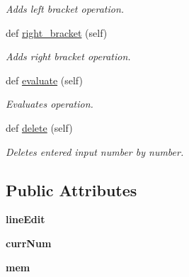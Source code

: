 \begin{DoxyCompactItemize}
\begin{DoxyCompactList}\small\item\em Adds left bracket operation. \end{DoxyCompactList}\item 
def \hyperlink{classmain__calculator_1_1_calculator_ae5a2100c17581ab6ed83b739a087f848}{right\+\_\+bracket} (self)
\begin{DoxyCompactList}\small\item\em Adds right bracket operation. \end{DoxyCompactList}\item 
\mbox{\label{classmain__calculator_1_1_calculator_a96e33c57d1198a4c62f0a03205a5eef8}} 
def \hyperlink{classmain__calculator_1_1_calculator_a96e33c57d1198a4c62f0a03205a5eef8}{evaluate} (self)
\begin{DoxyCompactList}\small\item\em Evaluates operation. \end{DoxyCompactList}\item 
\mbox{\label{classmain__calculator_1_1_calculator_a40ee4c3e99a1ef96153a5492fda20a91}} 
def \hyperlink{classmain__calculator_1_1_calculator_a40ee4c3e99a1ef96153a5492fda20a91}{delete} (self)
\begin{DoxyCompactList}\small\item\em Deletes entered input number by number. \end{DoxyCompactList}\end{DoxyCompactItemize}
\subsection*{Public Attributes}
\begin{DoxyCompactItemize}
\item 
\mbox{\label{classmain__calculator_1_1_calculator_a6ac650245830a61eee1ad9a7f2270267}} 
{\bfseries line\+Edit}
\item 
\mbox{\label{classmain__calculator_1_1_calculator_a218561734fa0968bd494edbcdd326979}} 
{\bfseries curr\+Num}
\item 
\mbox{\label{classmain__calculator_1_1_calculator_aef8b7f10a1c8302239a249ff5c1d360c}} 
{\bfseries mem}
\end{DoxyCompactItemize}


